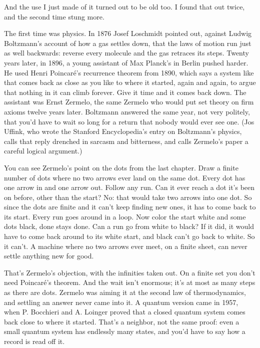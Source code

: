 \documentclass[11pt,twoside]{article}
\theoremstyle{thielethm}
\theoremstyle{thieledef}
\theoremstyle{thieledef}
\theoremstyle{thieledef}
\theoremstyle{thielethm}
\theoremstyle{thieleobs}
\theoremstyle{thielethm}
\begin{document}
And the use I just made of it turned out to be old too. I found that out twice, and the second time stung more.

The first time was physics. In 1876 Josef Loschmidt pointed out, against Ludwig Boltzmann's account of how a gas settles down, that the laws of motion run just as well backwards: reverse every molecule and the gas retraces its steps. Twenty years later, in 1896, a young assistant of Max Planck's in Berlin pushed harder. He used Henri Poincaré's recurrence theorem from 1890, which says a system like that comes back as close as you like to where it started, again and again, to argue that nothing in it can climb forever. Give it time and it comes back down. The assistant was Ernst Zermelo, the same Zermelo who would put set theory on firm axioms twelve years later. Boltzmann answered the same year, not very politely, that you'd have to wait so long for a return that nobody would ever see one. (Jos Uffink, who wrote the Stanford Encyclopedia's entry on Boltzmann's physics, calls that reply drenched in sarcasm and bitterness, and calls Zermelo's paper a careful logical argument.)

You can see Zermelo's point on the dots from the last chapter. Draw a finite number of dots where no two arrows ever land on the same dot. Every dot has one arrow in and one arrow out. Follow any run. Can it ever reach a dot it's been on before, other than the start? No: that would take two arrows into one dot. So since the dots are finite and it can't keep finding new ones, it has to come back to its start. Every run goes around in a loop. Now color the start white and some dots black, done stays done. Can a run go from white to black? If it did, it would have to come back around to its white start, and black can't go back to white. So it can't. A machine where no two arrows ever meet, on a finite sheet, can never settle anything new for good.

That's Zermelo's objection, with the infinities taken out. On a finite set you don't need Poincaré's theorem. And the wait isn't enormous; it's at most as many steps as there are dots. Zermelo was aiming it at the second law of thermodynamics, and settling an answer never came into it. A quantum version came in 1957, when P. Bocchieri and A. Loinger proved that a closed quantum system comes back close to where it started. That's a neighbor, not the same proof: even a small quantum system has endlessly many states, and you'd have to say how a record is read off it.
\end{document}
